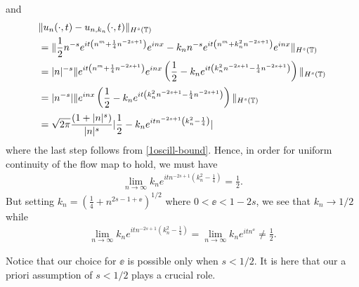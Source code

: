 %
%
and
%
%
\begin{equation*}
	\begin{split}
		& \|u_{n}(\cdot, t) - u_{n, k_{n}}(\cdot, t) \|_{H^{s}(\mathbb{T})}
		\\
		& = \|\frac{1}{2}n^{-s}e^{it\left( n^{m} + \frac{1}{4}n^{-2s+1}
		\right)}e^{inx} - k_{n}n^{-s}e^{it\left( n^{m} + k_{n}^{2}n^{-2s+1}
		\right)}e^{inx} \|_{H^{s}(\mathbb{T})}
		\\
		& = | n |^{-s} \|e^{it\left( n^{m} + \frac{1}{4}n^{-2s+1}
		\right)}e^{inx}\left( \frac{1}{2} - k_{n}e^{it\left(
		k_{n}^{2}n^{-2s+1}-\frac{1}{4}n^{-2s+1} \right)} \right)\|_{H^{s}(\mathbb{T})}
		\\
		& = | n^{-s} |\|e^{inx}\left( \frac{1}{2} - k_{n}e^{it\left(
		k_{n}^{2}n^{-2s+1} - \frac{1}{4}n^{-2s+1}
		\right)} \right) \|_{H^{s}(\mathbb{T})}
		\\
		& = \sqrt{2 \pi} \frac{(1 + | n |^s)}{|n|^s} | \frac{1}{2} - k_{n}e^{itn^{-2s+1}\left( k_{n}^{2}- \frac{1}{4}\right)} |
	\end{split}
\end{equation*}
%
%
where the last step follows from \eqref{1oscill-bound}. Hence, in order for uniform continuity of the flow map to hold, we must have
%
%
\begin{equation*}
	\begin{split}
		\lim_{n \to \infty}  k_{n} e^{itn^{-2s+1}\left( k_{n}^{2} -
		\frac{1}{4} \right)}  = \frac{1}{2}.
	\end{split}
\end{equation*}
%
%
But setting $k_{n} = \left( \frac{1}{4} + n^{2s-1 + \ee} \right)^{1/2}$ where
$0 < \ee < 1-2s$, we see that $k_n \to 1/2$ while
%
%
\begin{equation*}
	\begin{split}
		\lim_{n \to \infty} k_{n} e^{itn^{-2s+1}\left( k_{n}^{2} - \frac{1}{4}
		\right)} = \lim_{n \to \infty} k_{n} e^{itn^{\ee}} \neq \frac{1}{2}.
	\end{split}
\end{equation*}
%
\begin{framed}
\begin{remark}
	Notice that our choice for $\ee$ is possible only when $s < 1/2$.
	It is here that
	our a priori assumption of $s < 1/2$ plays a crucial role.
\end{remark}
\end{framed}

